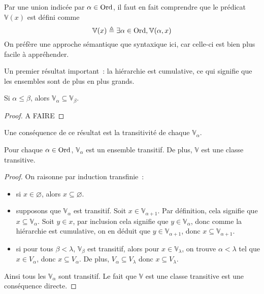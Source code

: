 \begin{remark}
  Par une union indicée par $\alpha \in \operatorname{Ord}$, il faut en fait comprendre que le
  prédicat $\mathbb V(x)$ est défini comme
  \[\mathbb V(x) \triangleq \exists \alpha \in \operatorname{Ord}, \mathbb V(\alpha,x)\]
  On préfère une approche sémantique que syntaxique ici, car celle-ci est bien
  plus facile à appréhender.
\end{remark}

Un premier résultat important~: la hiérarchie est cumulative, ce qui signifie
que les ensembles sont de plus en plus grands.

\begin{property}
  Si $\alpha \leq \beta$, alors $\mathbb V_\alpha\subseteq \mathbb V_\beta$.
\end{property}

\begin{proof}
  A FAIRE
\end{proof}

Une conséquence de ce résultat est la transitivité de chaque
$\mathbb V_\alpha$.

\begin{property}
  Pour chaque $\alpha\in\operatorname{Ord}$, $\mathbb V_\alpha$ est un ensemble transitif. De
  plus, $\mathbb V$ est une classe transitive.
\end{property}

\begin{proof}
  On raisonne par induction transfinie~:
  \begin{itemize}
  \item si $x\in \varnothing$, alors $x\subseteq\varnothing$.
  \item supposons que $\mathbb V_\alpha$ est transitif. Soit
    $x\in\mathbb V_{\alpha+1}$. Par définition, cela signifie que
    $x\subseteq \mathbb V_\alpha$. Soit $y\in x$, par inclusion cela signifie
    que $y\in \mathbb V_\alpha$, donc comme la hiérarchie est cumulative, on
    en déduit que $y\in \mathbb V_{\alpha +1}$, donc
    $x\subseteq \mathbb V_{\alpha +1}$.
  \item si pour tous $\beta < \lambda$, $\mathbb V_\beta$ est transitif, alors
    pour $x\in \mathbb V_\lambda$, on trouve $\alpha < \lambda$ tel que
    $x\in V_\alpha$, donc $x\subseteq V_\alpha$. De plus,
    $V_\alpha \subseteq V_\lambda$ donc $x\subseteq V_\lambda$.
  \end{itemize}
  Ainsi tous les $\mathbb V_\alpha$ sont transitif. Le fait que $\mathbb V$ est
  une classe transitive est une conséquence directe.
\end{proof}

